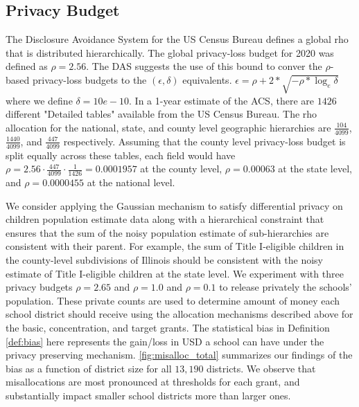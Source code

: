 \subsection{Privacy Budget}
The Disclosure Avoidance System for the US Census Bureau defines a global rho that is distributed hierarchically.
The global privacy-loss budget for 2020 was defined as $\rho = 2.56$. The DAS suggests the use of this bound to conver
the $\rho$-based privacy-loss budgets to the $(\epsilon, \delta)$ equivalents.
$\epsilon = \rho + 2 * \sqrt{-\rho * \log_e{\delta}}$ where we define $\delta=10e-10$. In a 1-year estimate of the ACS,
there are $1426$ different "Detailed tables" available from the US Census Bureau. The rho allocation for the national,
state, and county level geographic hierarchies are $\frac{104}{4099}$, $\frac{1440}{4099}$, and $\frac{447}{4099}$
respectively. Assuming that the county level privacy-loss budget is split equally across these tables,
each field would have $\rho = 2.56 \cdot \frac{447}{4099} \cdot \frac{1}{1426} = 0.0001957 $ at the county level,
$\rho = 0.00063$ at the state level, and $\rho = 0.0000455$ at the national level.

We consider applying the Gaussian mechanism to satisfy differential privacy on children population estimate data along
with a hierarchical constraint that ensures that the sum of the noisy population estimate of sub-hierarchies are
consistent with their parent. For example, the sum of Title I-eligible children in the county-level subdivisions
of Illinois should be consistent with the noisy estimate of Title I-eligible children at the state level. We experiment
with three privacy budgets $\rho =  2.65$ and $\rho = 1.0$ and $\rho = 0.1$ to release privately the schools' population. These
private counts are used to determine amount of money each school district should receive using the allocation mechanisms
described above for the basic, concentration, and target grants. The statistical bias in Definition \ref{def:bias} here
represents the gain/loss in USD a school can have under the privacy preserving mechanism. \ref{fig:misalloc_total}
summarizes our findings of the bias as a function of district size for all $13,190$ districts. We observe that
misallocations are most pronounced at thresholds for each grant, and substantially impact smaller school districts more
than larger ones.




